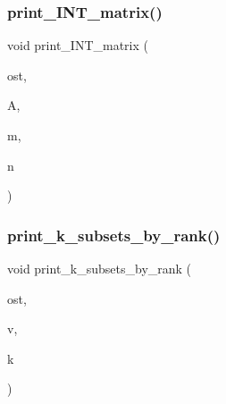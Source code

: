 \subsubsection{\texorpdfstring{print\+\_\+\+I\+N\+T\+\_\+matrix()}{print\_INT\_matrix()}}
{\footnotesize\ttfamily void print\+\_\+\+I\+N\+T\+\_\+matrix (\begin{DoxyParamCaption}\item[{ostream \&}]{ost,  }\item[{\mbox{\hyperlink{galois_8h_a09fddde158a3a20bd2dcadb609de11dc}{I\+NT}} $\ast$}]{A,  }\item[{\mbox{\hyperlink{galois_8h_a09fddde158a3a20bd2dcadb609de11dc}{I\+NT}}}]{m,  }\item[{\mbox{\hyperlink{galois_8h_a09fddde158a3a20bd2dcadb609de11dc}{I\+NT}}}]{n }\end{DoxyParamCaption})}

\mbox{\label{combinatorics_8_c_a573a66b52b275979fcd61939288879a3}} 
\subsubsection{\texorpdfstring{print\+\_\+k\+\_\+subsets\+\_\+by\+\_\+rank()}{print\_k\_subsets\_by\_rank()}}
{\footnotesize\ttfamily void print\+\_\+k\+\_\+subsets\+\_\+by\+\_\+rank (\begin{DoxyParamCaption}\item[{ostream \&}]{ost,  }\item[{\mbox{\hyperlink{galois_8h_a09fddde158a3a20bd2dcadb609de11dc}{I\+NT}}}]{v,  }\item[{\mbox{\hyperlink{galois_8h_a09fddde158a3a20bd2dcadb609de11dc}{I\+NT}}}]{k }\end{DoxyParamCaption})}

\mbox{\label{combinatorics_8_c_adec8ea5e9ef692fa342b4e632240904d}} 
